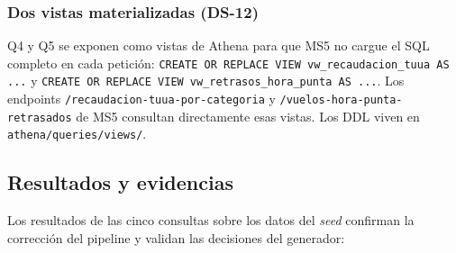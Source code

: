 \subsubsection{Dos vistas materializadas (DS-12)}
Q4 y Q5 se exponen como vistas de Athena para que MS5 no cargue el SQL
completo en cada petición:
\texttt{CREATE OR REPLACE VIEW vw\_recaudacion\_tuua AS ...} y
\texttt{CREATE OR REPLACE VIEW vw\_retrasos\_hora\_punta AS ...}. Los
endpoints \texttt{/recaudacion-tuua-por-categoria} y
\texttt{/vuelos-hora-punta-retrasados} de MS5 consultan directamente
esas vistas. Los DDL viven en \texttt{athena/queries/views/}.

\subsection{Resultados y evidencias}

Los resultados de las cinco consultas sobre los datos del \emph{seed}
confirman la corrección del pipeline y validan las decisiones del
generador:

